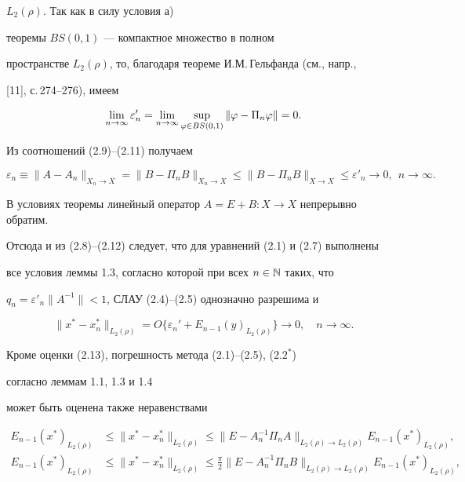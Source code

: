$L_2(\rho)$. Так как в силу условия а) 


теоремы $BS(0,1)$ --- компактное множество в полном


пространстве $L_2(\rho)$, то, благодаря теореме И.М.\,Гельфанда (см., напр.,


[11], с.\,274--276), имеем


\begin{equation}


\lim_{n\to \infty}\varepsilon'_n=\lim_{n\to \infty}\sup_{\vp\in BS(0,1)}


\|\vp-\Pi_n\vp\|=0.


\end{equation}





Из соотношений (2.9)--(2.11) получаем


\begin{equation}


\varepsilon_n \equiv \|A-A_n\|_{X_n\to X}=\|B-\Pi_nB\|_{X_n\to X} \le


\|B-\Pi_nB\|_{X\to X}\le \varepsilon'_n\to 0, \ \ n\to \infty.


\end{equation}


В условиях теоремы линейный оператор $A=E+B:X\to X$ непрерывно обратим.


Отсюда и из (2.8)--(2.12) следует, что для уравнений (2.1) и (2.7) выполнены


все условия леммы 1.3, согласно которой при всех $n\in \Bbb N$ таких, что


$q_n=\varepsilon'_n\|A^{-1}\|<1$, СЛАУ (2.4)--(2.5) однозначно разрешима и


\begin{equation}


\|x^*-x^{*}_{n}\|_{L_2(\rho)}=


O\{\varepsilon_{n}'+E_{n-1}(y)_{L_2(\rho)}\}\to 0,


\quad n\to\infty.


\end{equation}


Кроме оценки (2.13), погрешность метода  (2.1)--(2.5), ($2.2^*$)


согласно леммам 1.1, 1.3 и 1.4


может быть оценена также неравенствами


\begin{align}


E_{n-1}(x^*)_{L_2(\rho)}&\le\|x^*-x^*_{n}\|_{L_2(\rho)}\le\|E-A^{-1}_{n}


\Pi_nA\|_{L_2(\rho)\to L_2(\rho)} E_{n-1}(x^*)_{L_2(\rho)},\\


%


E_{n-1}(x^*)_{L_2(\rho)}&\le \|x^*-x^*_n\|_{L_2(\rho)}\le \frac{\pi}{2}


\|E-A^{-1}_n


\Pi_nB\|_{L_2(\rho)\to L_2(\rho)} E_{n-1}(x^{*})_{L_2(\rho)},


\end{align}



